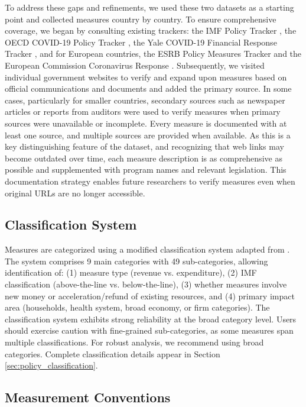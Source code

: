 \documentclass[12pt]{article}
\begin{document}
To address these gaps and refinements, we used these two datasets as a starting point and collected measures country by country. To ensure comprehensive coverage, we began by consulting existing trackers: the IMF Policy Tracker \citep{IMFPolicyResponsesCovid19}, the OECD COVID-19 Policy Tracker \citep{oecd2021covidpolicytracker}, the Yale COVID-19 Financial Response Tracker \citep{YaleCFRTV}, and for European countries, the ESRB Policy Measures Tracker \citep{ESRBCovidPolicyMeasures} and the European Commission Coronavirus Response \citep{EUCommissionCovidOverview}. Subsequently, we visited individual government websites to verify and expand upon measures based on official communications and documents and added the primary source. In some cases, particularly for smaller countries, secondary sources such as newspaper articles or reports from auditors were used to verify measures when primary sources were unavailable or incomplete. Every measure is documented with at least one source, and multiple sources are provided when available. As this is a key distinguishing feature of the dataset, and recognizing that web links may become outdated over time, each measure description is as comprehensive as possible and supplemented with program names and relevant legislation. This documentation strategy enables future researchers to verify measures even when original URLs are no longer accessible.

\subsection{Classification System}

Measures are categorized using a modified classification system adapted from \citep{LaceyMassadUtz2021}. The system comprises 9 main categories with 49 sub-categories, allowing identification of: (1) measure type (revenue vs. expenditure), (2) IMF classification (above-the-line vs. below-the-line), (3) whether measures involve new money or acceleration/refund of existing resources, and (4) primary impact area (households, health system, broad economy, or firm categories). The classification system exhibits strong reliability at the broad category level. Users should exercise caution with fine-grained sub-categories, as some measures span multiple classifications. For robust analysis, we recommend using broad categories. Complete classification details appear in Section \ref{sec:policy_classification}.

\subsection{Measurement Conventions}
\end{document}
